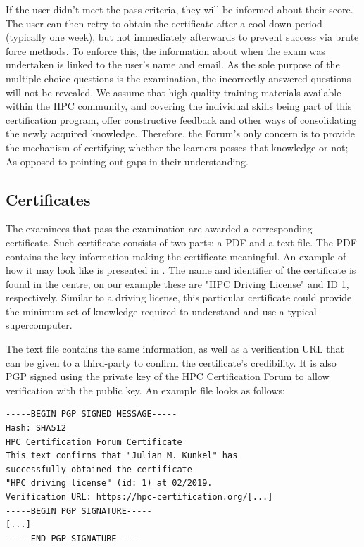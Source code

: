 \documentclass[jocse]{jocseart}
\begin{document}
If the user didn't meet the pass criteria, they will be informed about their score.
The user can then retry to obtain the certificate after a cool-down period (typically one week), but not immediately afterwards to prevent success via brute force methods.
To enforce this, the information about when the exam was undertaken is linked to the user's name and email.
As the sole purpose of the multiple choice questions is the examination, the incorrectly answered questions will not be revealed.
We assume that high quality training materials available within the HPC community, and covering the individual skills being part of this certification program, offer constructive feedback and other ways of consolidating the newly acquired knowledge.
Therefore, the Forum's only concern is to provide the mechanism of certifying whether the learners posses that knowledge or not;
As opposed to pointing out gaps in their understanding.


\subsection{Certificates}

The examinees that pass the examination are awarded a corresponding certificate. Such certificate consists of two parts: a PDF and a text file.
The PDF contains the key information making the certificate meaningful. An example of how it may look like is presented in .
The name and identifier of the certificate is found in the centre, on our example these are "HPC Driving License" and ID 1, respectively.
Similar to a driving license, this particular certificate could provide the minimum set of knowledge required to understand and use a typical supercomputer.

The text file contains the same information, as well as a verification URL that can be given to a third-party to confirm the certificate's credibility.
It is also PGP signed using the private key of the HPC Certification Forum to allow verification with the public key. An example file looks as follows:
\begin{verbatim}
-----BEGIN PGP SIGNED MESSAGE-----
Hash: SHA512
HPC Certification Forum Certificate
This text confirms that "Julian M. Kunkel" has
successfully obtained the certificate
"HPC driving license" (id: 1) at 02/2019.
Verification URL: https://hpc-certification.org/[...]
-----BEGIN PGP SIGNATURE-----
[...]
-----END PGP SIGNATURE-----
\end{verbatim}
\end{document}
